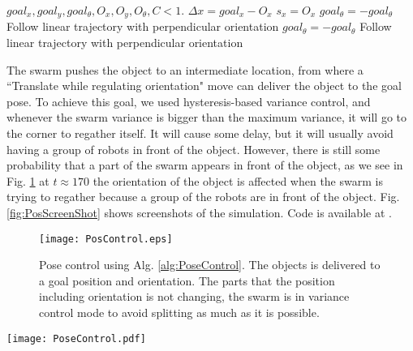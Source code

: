 \begin{algorithm}
\caption{PoseControl}\label{alg:PoseControl}
\begin{algorithmic}[1]
\Require $goal_x, goal_y, goal_{\theta},O_x, O_y, O_{\theta}, C<1$.
\State $\Delta x = goal_x - O_x$
\State $s_x = O_x$ 
\State $goal_{\theta} = -goal_{\theta}$ 
\State Follow linear trajectory with perpendicular orientation
\EndWhile
\State $goal_{\theta} = -goal_{\theta}$
\State Follow linear trajectory with perpendicular orientation
\end{algorithmic}
\end{algorithm}



The swarm pushes the object to an intermediate location, from where a ``Translate while regulating orientation" move can deliver the object to the goal pose. 
To achieve this goal, we used hysteresis-based variance control, and whenever the swarm variance is bigger than the maximum variance, it will go to the corner to regather itself. 
It will cause some delay, but it will usually avoid having a group of robots in front of the object. However, there is still some probability that a part of the swarm appears in front of the object, as we see in Fig. \ref{fig:PosControlFig} at $t\approx170$ the orientation of the object is affected when the swarm is trying to regather because a group of the robots are in front of the object. Fig. \ref{fig:PosScreenShot} shows screenshots of the simulation. Code is available at \cite{Shahrokhi16pose}.

\begin{figure}
\begin{center}
	\texttt{[image: PosControl.eps]}
\end{center}
\vspace{-2em}
\caption{\label{fig:PosControlFig} 
Pose control using Alg. \ref{alg:PoseControl}.  The objects is delivered to a goal position and orientation. The parts that the position including orientation is not changing, the swarm is in variance control mode to avoid splitting as much as it is possible. 
}
\vspace{-1em}
\end{figure}


\begin{figure*}
\centering

\texttt{[image: PoseControl.pdf]}
\vspace{0em}
\caption{\label{fig:PosScreenShot}
Different situations for position control of the block while controlling its orientation. First goal is getting to the perpendicular line to the goal, then following that linear line while regulating the orientation.
}
\end{figure*}


